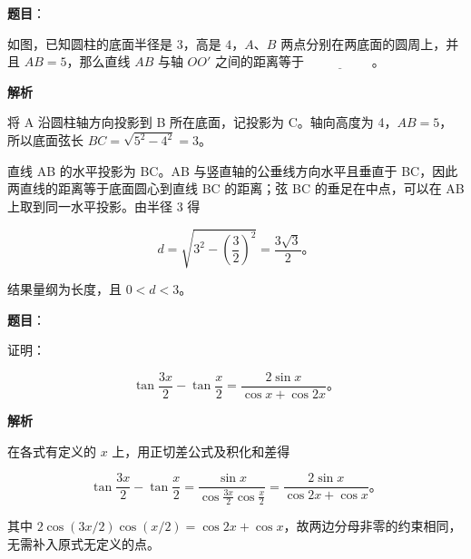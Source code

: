 \begin{answer}

\textbf{题目}：

如图，已知圆柱的底面半径是 $3$，高是 $4$，$A$、$B$ 两点分别在两底面的圆周上，并且 $AB=5$，那么直线 $AB$ 与轴 $OO'$ 之间的距离等于 $\underline{\hspace{5em}}$。
\nopagebreak[4]
\begin{center}\end{center}
\nopagebreak[4]
\textbf{解析}

将 A 沿圆柱轴方向投影到 B 所在底面，记投影为 C。轴向高度为 4，$AB=5$，所以底面弦长 $BC=\sqrt{5^2-4^2}=3$。

直线 AB 的水平投影为 BC。AB 与竖直轴的公垂线方向水平且垂直于 BC，因此两直线的距离等于底面圆心到直线 BC 的距离；弦 BC 的垂足在中点，可以在 AB 上取到同一水平投影。由半径 3 得

\nopagebreak[4]
\[
d=\sqrt{3^2-\left(\frac32\right)^2}=\frac{3\sqrt3}{2}\text{。}
\]

结果量纲为长度，且 $0<d<3$。


\end{answer}
\begin{answer}

\textbf{题目}：

证明：

\nopagebreak[4]
\[
\tan\frac{3x}{2}-\tan\frac{x}{2}=\frac{2\sin x}{\cos x+\cos2x}\text{。}
\]

\textbf{解析}

在各式有定义的 $x$ 上，用正切差公式及积化和差得

\nopagebreak[4]
\[
\tan\frac{3x}{2}-\tan\frac{x}{2}
=\frac{\sin x}{\cos\frac{3x}{2}\cos\frac{x}{2}}
=\frac{2\sin x}{\cos2x+\cos x}\text{。}
\]

其中 $2\cos(3x/2)\cos(x/2)=\cos2x+\cos x$，故两边分母非零的约束相同，无需补入原式无定义的点。


\end{answer}
